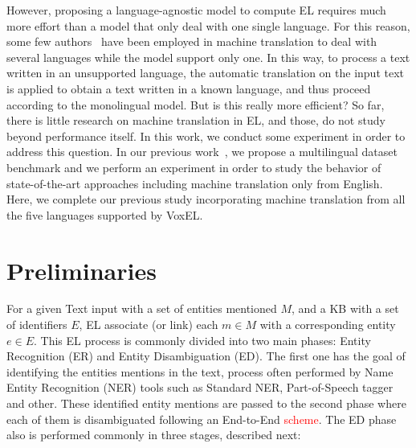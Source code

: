\documentclass{llncs}
\begin{document}
However, proposing a language-agnostic model to compute EL requires much more effort than a model that only deal with one single language. For this reason, some few authors~\cite{Monahan2011,Cassidy2012} have been employed in machine translation to deal with several languages while the model support only one. In this way, to process a text written in an unsupported language, the automatic translation on the input text is applied to obtain a text written in a known language, and thus proceed according to the monolingual model. But is this really more efficient? So far, there is little research on machine translation in EL, and those, do not study beyond performance itself. In this work, we conduct some experiment in order to address this question. In our previous work~\cite{ourISWC}, we propose a multilingual dataset benchmark and we perform an experiment in order to study the behavior of state-of-the-art approaches including machine translation only from English. Here, we complete our previous study incorporating machine translation from all the five languages supported by VoxEL. 


\section{Preliminaries}

For a given Text input with a set of entities mentioned $M$, and a KB with a set of  identifiers $E$, EL associate (or link) each $m\in{}M$ with a corresponding entity $e\in{}E$. This EL process is commonly divided into two main phases: Entity Recognition (ER) and Entity Disambiguation (ED). The first one has the goal of identifying the entities mentions in the text, process often performed by Name Entity Recognition (NER) tools such as Standard NER, Part-of-Speech tagger and other. These identified entity mentions are passed to the second phase where each of them is disambiguated following an End-to-End \textcolor{red}{scheme}. The ED phase also is performed commonly in three stages, described next:
\end{document}
